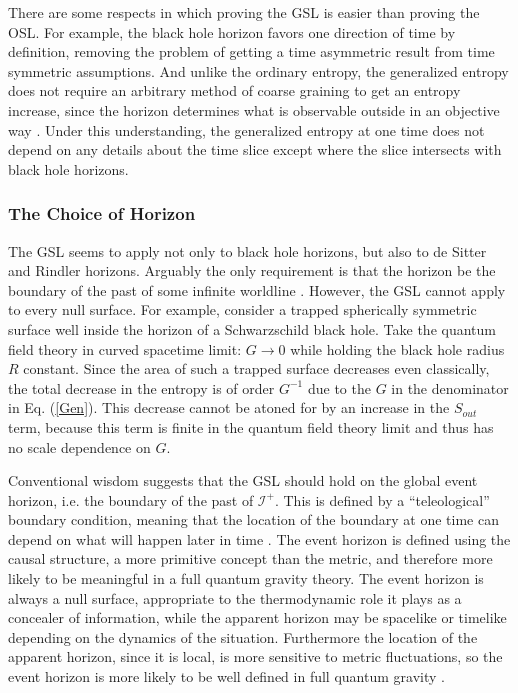 \documentclass{article}
\begin{document}
There are some respects in which proving the GSL is easier than proving the OSL.  For example, the black hole horizon favors one direction of time by definition, removing the problem of getting a time asymmetric result from time symmetric assumptions.  And unlike the ordinary entropy, the generalized entropy does not require an arbitrary method of coarse graining to get an entropy increase, since the horizon determines what is observable outside in an objective way \cite{sorkin05}.  Under this understanding, the generalized entropy at one time does not depend on any details about the time slice except where the slice intersects with black hole horizons.

\subsubsection{The Choice of Horizon}\label{choice}

The GSL seems to apply not only to black hole horizons, but also to de Sitter and Rindler horizons.  Arguably the only requirement is that the horizon be the boundary of the past of some infinite worldline \cite{JP03}.  However, the GSL cannot apply to every null surface.  For example, consider a trapped spherically symmetric surface well inside the horizon of a Schwarzschild black hole.  Take the quantum field theory in curved spacetime limit: $G \to 0$ while holding the black hole radius $R$ constant.  Since the area of such a trapped surface decreases even classically, the total decrease in the entropy is of order $G^{-1}$ due to the $G$ in the denominator in Eq. (\ref{Gen}).  This decrease cannot be atoned for by an increase in the $S_{out}$ term, because this term is finite in the quantum field theory limit and thus has no scale dependence on $G$.

Conventional wisdom suggests that the GSL should hold on the global event horizon, i.e. the boundary of the past of $\mathcal{I}^{+}$.  This is defined by a ``teleological'' boundary condition, meaning that the location of the boundary at one time can depend on what will happen later in time \cite{PTR86}.  The event horizon is defined using the causal structure, a more primitive concept than the metric, and therefore more likely to be meaningful in a full quantum gravity theory.  The event horizon is always a null surface, appropriate to the thermodynamic role it plays as a concealer of information, while the apparent horizon may be spacelike or timelike depending on the dynamics of the situation.  Furthermore the location of the apparent horizon, since it is local, is more sensitive to metric fluctuations, so the event horizon is more likely to be well defined in full quantum gravity \cite{SS99}.
\end{document}
